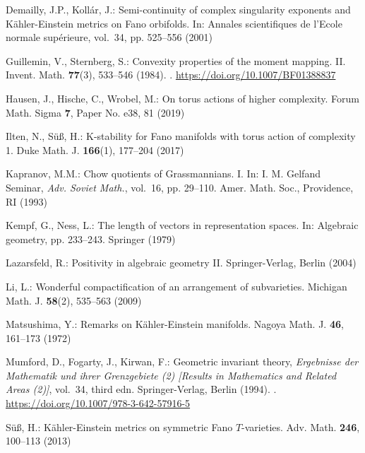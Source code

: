 \documentclass{amsart}
\theoremstyle{definition}
\begin{document}
\begin{thebibliography}{10}
Demailly, J.P., Koll{\'a}r, J.: Semi-continuity of complex singularity
  exponents and {K}{\"a}hler-{E}instein metrics on {F}ano orbifolds.
\newblock In: Annales scientifiques de l'Ecole normale sup{\'e}rieure, vol.~34,
  pp. 525--556 (2001)

Guillemin, V., Sternberg, S.: Convexity properties of the moment mapping. {II}.
\newblock Invent. Math. \textbf{77}(3), 533--546 (1984).
\newblock {}.
\newblock \urlprefix\url{https://doi.org/10.1007/BF01388837}

Hausen, J., Hische, C., Wrobel, M.: On torus actions of higher complexity.
\newblock Forum Math. Sigma \textbf{7}, Paper No. e38, 81 (2019)

Ilten, N., S{\"u}{\ss}, H.: K-stability for {F}ano manifolds with torus action
  of complexity 1.
\newblock Duke Math. J. \textbf{166}(1), 177--204 (2017)

Kapranov, M.M.: Chow quotients of {G}rassmannians. {I}.
\newblock In: I. {M}. {G}elfand {S}eminar, \emph{Adv. Soviet Math.},
  vol.~16, pp. 29--110. Amer. Math. Soc., Providence, RI (1993)

Kempf, G., Ness, L.: The length of vectors in representation spaces.
\newblock In: Algebraic geometry, pp. 233--243. Springer (1979)

Lazarsfeld, R.: Positivity in algebraic geometry II.
\newblock Springer-Verlag, Berlin (2004)

Li, L.: Wonderful compactification of an arrangement of subvarieties.
\newblock Michigan Math. J. \textbf{58}(2), 535--563 (2009)

{M}atsushima, Y.: Remarks on {K}{\"a}hler-{E}instein manifolds.
\newblock Nagoya {M}ath. {J}. \textbf{46}, 161--173 (1972)

Mumford, D., Fogarty, J., Kirwan, F.: Geometric invariant theory,
  \emph{Ergebnisse der Mathematik und ihrer Grenzgebiete (2) [Results in
  Mathematics and Related Areas (2)]}, vol.~34, third edn.
\newblock Springer-Verlag, Berlin (1994).
\newblock {}.
\newblock \urlprefix\url{https://doi.org/10.1007/978-3-642-57916-5}

S\"{u}\ss, H.: K\"{a}hler-{E}instein metrics on symmetric {F}ano
  {$T$}-varieties.
\newblock Adv. Math. \textbf{246}, 100--113 (2013)


\end{thebibliography}
\end{document}
